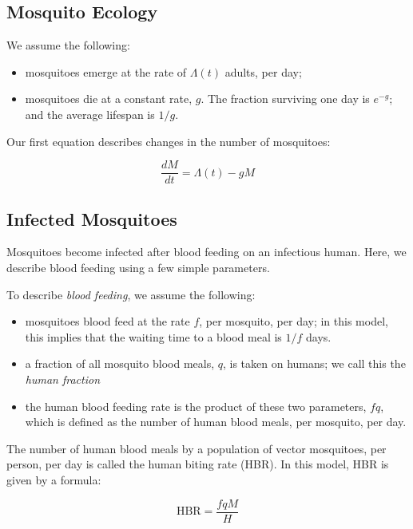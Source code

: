 \documentclass[
]{book}
\begin{document}
\hypertarget{mosquito-ecology}{%
\subsection{Mosquito Ecology}\label{mosquito-ecology}}

We assume the following:

\begin{itemize}
\item
  mosquitoes emerge at the rate of \(\Lambda(t)\) adults, per day;
\item
  mosquitoes die at a constant rate, \(g\). The fraction surviving one day is \(e^{-g}\); and the average lifespan is \(1/g\).
\end{itemize}

Our first equation describes changes in the number of mosquitoes:

\begin{equation}
\frac{dM}{dt} = \Lambda(t) - g M
\end{equation}

\hypertarget{infected-mosquitoes}{%
\subsection{Infected Mosquitoes}\label{infected-mosquitoes}}

Mosquitoes become infected after blood feeding on an infectious human. Here, we describe blood feeding using a few simple parameters.

To describe \emph{blood feeding}, we assume the following:

\begin{itemize}
\item
  mosquitoes blood feed at the rate \(f\), per mosquito, per day; in this model, this implies that the waiting time to a blood meal is \(1/f\) days.
\item
  a fraction of all mosquito blood meals, \(q\), is taken on humans; we call this the \emph{human fraction}
\item
  the human blood feeding rate is the product of these two parameters, \(fq\), which is defined as the number of human blood meals, per mosquito, per day.
\end{itemize}

The number of human blood meals by a population of vector mosquitoes, per person, per day is called the human biting rate (HBR). In this model, HBR is given by a formula:

\[\mbox{HBR} = \frac{fqM}{H}\]
\end{document}
